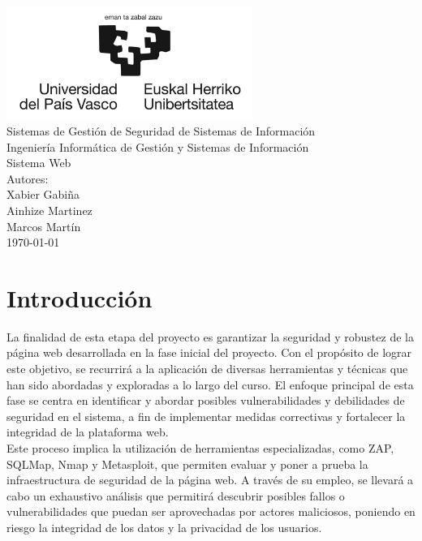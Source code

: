 \documentclass{report}
\begin{document}
    \begin{titlepage}
        \centering
        \includegraphics[width=0.6\textwidth]{./img/miscelanio/logo.jpg}\\
        \vspace{1cm}
        \LARGE Sistemas de Gestión de Seguridad de Sistemas de Información\\
        \vspace{0.5cm}
        \Large Ingeniería Informática de Gestión y Sistemas de Información\\
        \vspace{3cm}
        \Huge Sistema Web\\
        \vspace{2.5cm}
        \Large Autores:\\
        \vspace{0.2cm}
        \large Xabier Gabiña\\
        \large Ainhize Martinez\\
        \large Marcos Martín\\
        \vfill
        \today
    \end{titlepage}
    \tableofcontents
    \chapter{Introducción}
        La finalidad de esta etapa del proyecto es garantizar la seguridad y robustez de la página web desarrollada en la fase inicial del proyecto. Con el propósito de lograr este objetivo, se recurrirá a la aplicación de diversas herramientas y técnicas que han sido abordadas y exploradas a lo largo del curso. El enfoque principal de esta fase se centra en identificar y abordar posibles vulnerabilidades y debilidades de seguridad en el sistema, a fin de implementar medidas correctivas y fortalecer la integridad de la plataforma web.\\
        
        Este proceso implica la utilización de herramientas especializadas, como ZAP, SQLMap, Nmap y Metasploit, que permiten evaluar y poner a prueba la infraestructura de seguridad de la página web. A través de su empleo, se llevará a cabo un exhaustivo análisis que permitirá descubrir posibles fallos o vulnerabilidades que puedan ser aprovechadas por actores maliciosos, poniendo en riesgo la integridad de los datos y la privacidad de los usuarios.\\
        
\end{document}
